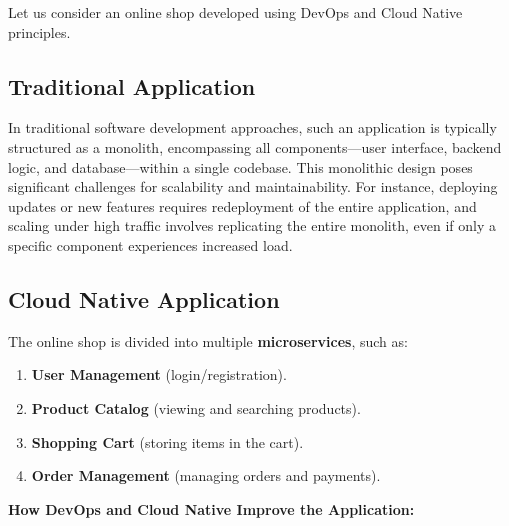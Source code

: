 Let us consider an online shop developed using DevOps and Cloud Native principles.

\subsection*{Traditional Application}

In traditional software development approaches, such an application is typically structured as a monolith, encompassing all components—user interface, backend logic, and database—within a single codebase. This monolithic design poses significant challenges for scalability and maintainability. For instance, deploying updates or new features requires redeployment of the entire application, and scaling under high traffic involves replicating the entire monolith, even if only a specific component experiences increased load.

\subsection{Cloud Native Application}

The online shop is divided into multiple \textbf{microservices}, such as:

\begin{enumerate}
    \item \textbf{User Management} (login/registration).
    \item \textbf{Product Catalog} (viewing and searching products).
    \item \textbf{Shopping Cart} (storing items in the cart).
    \item \textbf{Order Management} (managing orders and payments).
\end{enumerate}

\textbf{How DevOps and Cloud Native Improve the Application:}

